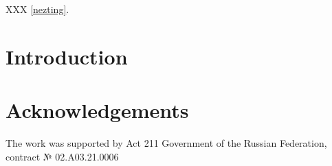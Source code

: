 \documentclass{../download/tPRS2e}
\begin{document}
XXX \ref{nezting}.

\section{Introduction}

\section*{Acknowledgements}

The work was supported by Act 211 Government of the Russian Federation, contract № 02.A03.21.0006


\nocite{*}

\end{document}
